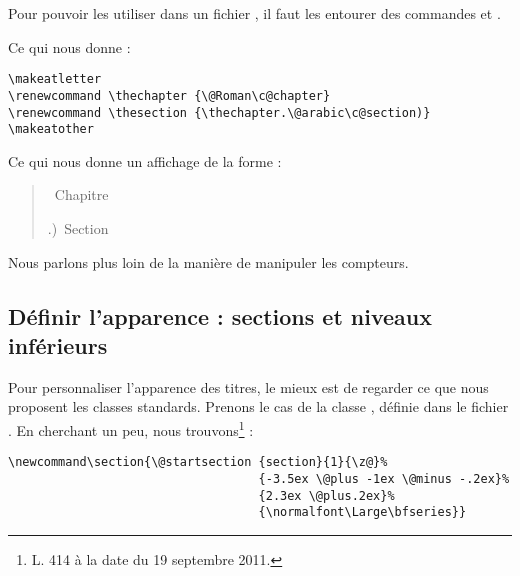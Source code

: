 Pour pouvoir les utiliser dans un fichier , il faut les entourer des commandes  et .

Ce qui nous donne : 

\begin{verbatim}
\makeatletter
\renewcommand \thechapter {\@Roman\c@chapter}
\renewcommand \thesection {\thechapter.\@arabic\c@section)}
\makeatother
\end{verbatim}


\makeatletter
\let\oldthechapter\thechapter
\let\oldthesection\thesection
\renewcommand \thechapter {\@Roman\c@chapter}
\renewcommand \thesection {\thechapter.\@arabic\c@section)}
\makeatother

Ce qui nous donne un affichage de la forme :


\begin{quotation}
\thechapter~Chapitre 

\thesection~Section
\end{quotation}

\renewcommand{\thechapter}{\oldthechapter}
\renewcommand{\thesection}{\oldthesection}


\begin{plusloins}
Nous parlons plus loin de la manière de manipuler les compteurs.
\end{plusloins}

\subsection{Définir l'apparence : sections et niveaux inférieurs}\label{apparencetitre}

Pour personnaliser l'apparence des titres, le mieux est de regarder ce que nous proposent les classes standards. Prenons le cas de la classe , définie dans le fichier . En cherchant un peu, nous trouvons\footnote{L. 414 à la date du 19 septembre 2011.} :

\begin{verbatim}
\newcommand\section{\@startsection {section}{1}{\z@}%
                                   {-3.5ex \@plus -1ex \@minus -.2ex}%
                                   {2.3ex \@plus.2ex}%
                                   {\normalfont\Large\bfseries}}
\end{verbatim}

